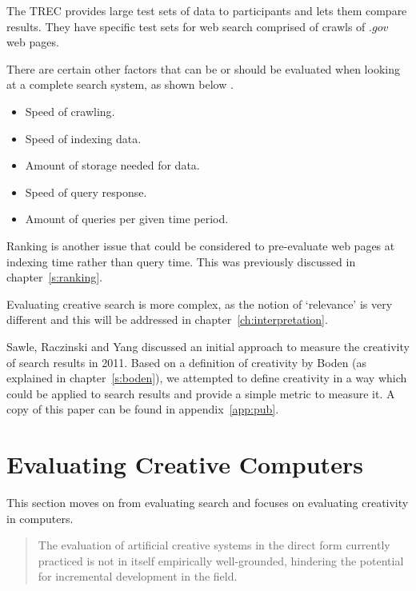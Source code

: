 The \acf{TREC} \autocite{Nist2016} provides large test sets of data \autocite{Trec2011} to participants and lets them compare results. They have specific test sets for web search comprised of crawls of $.gov$ web pages.

There are certain other factors that can be or should be evaluated when looking at a complete search system, as shown below \autocite{Baeza-Yates2011}. 

\begin{itemize}
  \item Speed of crawling.
  \item Speed of indexing data.
  \item Amount of storage needed for data.
  \item Speed of query response.
  \item Amount of queries per given time period.
\end{itemize}

Ranking is another issue that could be considered to pre-evaluate web pages at indexing time rather than query time. This was previously discussed in chapter~\ref{s:ranking}.

\spirals

Evaluating creative search is more complex, as the notion of `relevance' is very different and this will be addressed in chapter~\ref{ch:interpretation}. 

Sawle, Raczinski and Yang \autocite*{Sawle2011} discussed an initial approach to measure the creativity of search results in 2011. Based on a definition of creativity by Boden (as explained in chapter~\ref{s:boden}), we attempted to define creativity in a way which could be applied to search results and provide a simple metric to measure it. A copy of this paper can be found in appendix~\ref{app:pub}.


\section{Evaluating Creative Computers}
\label{s:creattributes}

This section moves on from evaluating search and focuses on evaluating creativity in computers.

\begin{quotation}
  The evaluation of artificial creative systems in the direct form currently practiced is not in itself empirically well-grounded, hindering the potential for incremental development in the field. 
\end{quotation}

